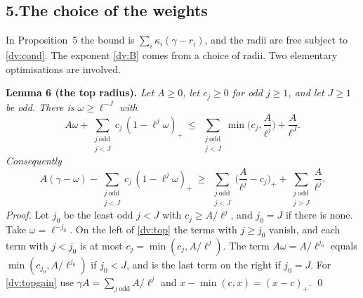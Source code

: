 \documentclass[11pt,letterpaper]{article}
\begin{document}
\subsection*{5.\quad The choice of the weights}

In Proposition~5 the bound is $\sum_i\kappa_i(\gamma-r_i)$, and the radii are free subject to
\eqref{dv:cond}. The exponent \eqref{dv:B} comes from a choice of radii. Two elementary optimisations are
involved.

\textbf{Lemma 6 (the top radius).} \emph{Let $A\ge0$, let $c_j\ge0$ for odd $j\ge1$, and let $J\ge1$ be odd.
There is $\omega\ge\ell^{-J}$ with}
\begin{equation}\label{dv:top}
 A\omega+\sum_{\substack{j\ \mathrm{odd}\\ j<J}}c_j\,(1-\ell^j\omega)_+\ \le\
 \sum_{\substack{j\ \mathrm{odd}\\ j<J}}\min\Big(c_j,\frac A{\ell^j}\Big)+\frac A{\ell^J}.
\end{equation}
\emph{Consequently}
\begin{equation}\label{dv:topgain}
 A(\gamma-\omega)-\sum_{\substack{j\ \mathrm{odd}\\ j<J}}c_j\,(1-\ell^j\omega)_+\ \ge\
 \sum_{\substack{j\ \mathrm{odd}\\ j<J}}\Big(\frac A{\ell^j}-c_j\Big)_++\sum_{\substack{j\ \mathrm{odd}\\ j>J}}\frac A{\ell^j}.
\end{equation}
\emph{Proof.} Let $j_0$ be the least odd $j<J$ with $c_j\ge A/\ell^j$, and $j_0=J$ if there is none. Take
$\omega=\ell^{-j_0}$. On the left of \eqref{dv:top} the terms with $j\ge j_0$ vanish, and each term
with $j<j_0$ is at most $c_j=\min(c_j,A/\ell^j)$. The term $A\omega=A/\ell^{j_0}$ equals
$\min(c_{j_0},A/\ell^{j_0})$ if $j_0<J$, and is the last term on the right if $j_0=J$. For
\eqref{dv:topgain} use $\gamma A=\sum_{j\ \mathrm{odd}}A/\ell^j$ and $x-\min(c,x)=(x-c)_+$. \qed
\end{document}
